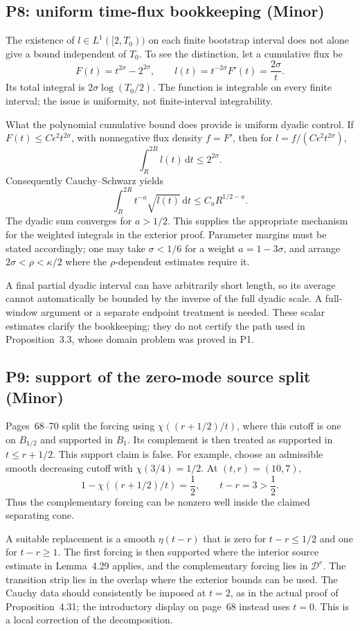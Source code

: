 \documentclass[10pt]{article}
\begin{document}
\subsection*{P8: uniform time-flux bookkeeping (Minor)}
The existence of \(l\in L^1([2,T_0))\) on each finite bootstrap interval does not alone give a bound independent of \(T_0\). To see the distinction, let a cumulative flux be \[F(t)=t^{2\sigma}-2^{2\sigma},\qquad
 l(t)=t^{-2\sigma}F'(t)=\frac{2\sigma}{t}.\] Its total integral is \(2\sigma\log(T_0/2)\). The function is integrable on every finite interval; the issue is uniformity, not finite-interval integrability.\par
What the polynomial cumulative bound does provide is uniform dyadic control. If \(F(t)\leq C\epsilon^2t^{2\sigma}\), with nonnegative flux density \(f=F'\), then for \(l=f/(C\epsilon^2t^{2\sigma})\), \[\int_R^{2R}l(t)\,\mathrm dt\leq2^{2\sigma}.\] Consequently Cauchy–Schwarz yields \[\int_R^{2R}t^{-a}\sqrt{l(t)}\,\mathrm dt
 \leq C_a R^{1/2-a}.\] The dyadic sum converges for \(a>1/2\). This supplies the appropriate mechanism for the weighted integrals in the exterior proof. Parameter margins must be stated accordingly; one may take \(\sigma<1/6\) for a weight \(a=1-3\sigma\), and arrange \(2\sigma<\rho<\kappa/2\) where the \(\rho\)-dependent estimates require it.\par
A final partial dyadic interval can have arbitrarily short length, so its average cannot automatically be bounded by the inverse of the full dyadic scale. A full-window argument or a separate endpoint treatment is needed. These scalar estimates clarify the bookkeeping; they do not certify the path used in Proposition 3.3, whose domain problem was proved in P1.\par
\subsection*{P9: support of the zero-mode source split (Minor)}
Pages 68–70 split the forcing using \(\chi((r+1/2)/t)\), where this cutoff is one on \(B_{1/2}\) and supported in \(B_1\). Its complement is then treated as supported in \(t\leq r+1/2\). This support claim is false. For example, choose an admissible smooth decreasing cutoff with \(\chi(3/4)=1/2\). At \((t,r)=(10,7)\), \[1-\chi((r+1/2)/t)=\frac12,\qquad t-r=3>\frac12.\] Thus the complementary forcing can be nonzero well inside the claimed separating cone.\par
A suitable replacement is a smooth \(\eta(t-r)\) that is zero for \(t-r\leq1/2\) and one for \(t-r\geq1\). The first forcing is then supported where the interior source estimate in Lemma 4.29 applies, and the complementary forcing lies in \(\mathcal D^e\). The transition strip lies in the overlap where the exterior bounds can be used. The Cauchy data should consistently be imposed at \(t=2\), as in the actual proof of Proposition 4.31; the introductory display on page 68 instead uses \(t=0\). This is a local correction of the decomposition.\par
\end{document}
